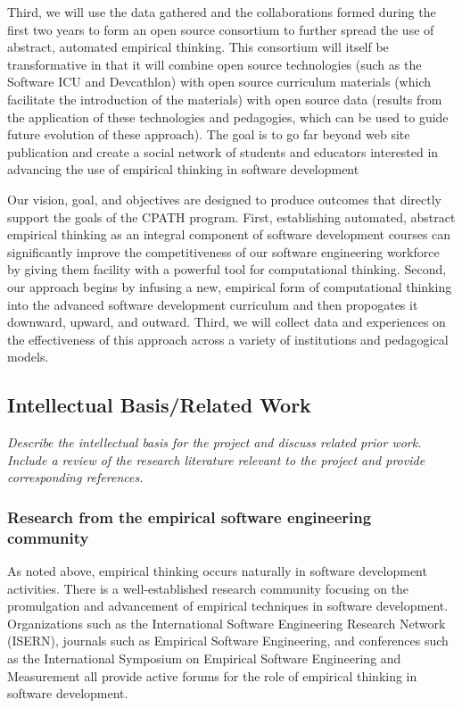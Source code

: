 Third, we will use the data gathered and the collaborations formed during
the first two years to form an open source consortium to further spread the
use of abstract, automated empirical thinking.  This consortium will itself
be transformative in that it will combine open source technologies (such as
the Software ICU and Devcathlon) with open source curriculum materials
(which facilitate the introduction of the materials) with open source data
(results from the application of these technologies and pedagogies, which
can be used to guide future evolution of these approach).  The goal is to
go far beyond web site publication and create a social network of students
and educators interested in advancing the use of empirical thinking in
software development

Our vision, goal, and objectives are designed to produce outcomes that
directly support the goals of the CPATH program.  First, establishing
automated, abstract empirical thinking as an integral component of software
development courses can significantly improve the competitiveness of our
software engineering workforce by giving them facility with a powerful tool
for computational thinking.  Second, our approach begins by infusing a new,
empirical form of computational thinking into the advanced software
development curriculum and then propogates it downward, upward, and
outward.  Third, we will collect data and experiences on the effectiveness
of this approach across a variety of institutions and pedagogical models.

\subsection{Intellectual Basis/Related Work}

{\em Describe the intellectual basis for the project and discuss related
prior work.  Include a review of the research literature relevant to the
project and provide corresponding references. }

\bigskip

\subsubsection{Research from the empirical software engineering community}

As noted above, empirical thinking occurs naturally in software development
activities.  There is a well-established research community focusing on the
promulgation and advancement of empirical techniques in software
development.  Organizations such as the International Software Engineering
Research Network (ISERN), journals such as Empirical Software Engineering,
and conferences such as the International Symposium on Empirical Software
Engineering and Measurement all provide active forums for the role of
empirical thinking in software development.

